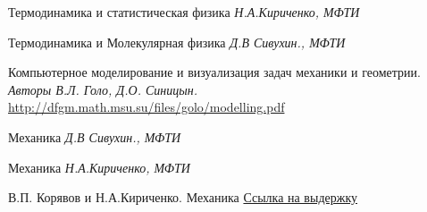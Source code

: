\documentclass[twoside,twocolumn, 11pt]{article}
\theoremstyle{plain}
\theoremstyle{definition}
\begin{document}
\begin{thebibliography}{99} %

Термодинамика и статистическая физика {\em
Н.А.Кириченко, МФТИ}

Термодинамика и Молекулярная физика {\em
Д.В Сивухин., МФТИ}

Компьютерное моделирование и визуализация задач механики и
геометрии. {\em Авторы В.Л. Голо, Д.О. Синицын.}
\href{http://dfgm.math.msu.su/files/golo/modelling.pdf}{http://dfgm.math.msu.su/files/golo/modelling.pdf}

Механика {\em Д.В Сивухин., МФТИ}

Механика {\em Н.А.Кириченко, МФТИ}

В.П. Корявов и Н.А.Кириченко. Механика
\href{https://vk.com/doc85020018_467835549?hash=d80f20a3d0b8f6643c&dl=bc29371e14b5f0ebd0}{Ссылка на выдержку}

\end{thebibliography}

\end{document}

